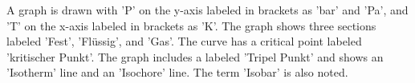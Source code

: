 A graph is drawn with 'P' on the y-axis labeled in brackets as 'bar' and 'Pa', and 'T' on the x-axis labeled in brackets as 'K'. The graph shows three sections labeled 'Fest', 'Flüssig', and 'Gas'. The curve has a critical point labeled 'kritischer Punkt'. The graph includes a labeled 'Tripel Punkt' and shows an 'Isotherm' line and an 'Isochore' line. The term 'Isobar' is also noted.